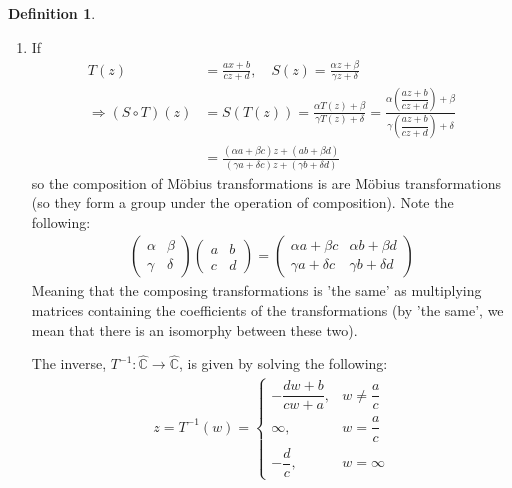 \documentclass[12pt, a4paper]{article}
\theoremstyle{plain}
\theoremstyle{definition}
\newtheorem{definition}{Definition} %
\begin{document}
\begin{definition}
\begin{enumerate}
					\item If
						\begin{align*}
							T(z) &= \frac{ax+b}{cz+d}, \quad S(z) = \frac{\alpha z+\beta}{\gamma z + \delta}\\
							\Rightarrow (S\circ T)(z) &=
							S(T(z)) = 
							\frac{\alpha T(z) + \beta}{\gamma T(z) + \delta} = 
							\frac{\alpha\left(\dfrac{az+b}{cz+d}\right)+\beta}{\gamma\left(\dfrac{az+b}{cz+d}\right) + \delta}\\ &=
							\frac{(\alpha a + \beta c)z + (ab+\beta d)}{(\gamma a + \delta c)z + (\gamma b + \delta d)}
						\end{align*}
						so the composition of Möbius transformations is are Möbius transformations (so they form a group under the operation of composition). Note the following:
						\begin{align*}
							\begin{pmatrix}
								\alpha & \beta\\
								\gamma & \delta
							\end{pmatrix}
							\begin{pmatrix}
								a & b\\
								c & d
							\end{pmatrix} = 
							\begin{pmatrix}
								\alpha a + \beta c & \alpha b + \beta d\\
								\gamma a + \delta c & \gamma b + \delta d
							\end{pmatrix}
						\end{align*}
						Meaning that the composing transformations is 'the same' as multiplying matrices containing the coefficients of the transformations (by 'the same', we mean that there is an isomorphy between these two).

						The inverse, $T^{-1}:\hat{\mathbb{C}}\to \hat{\mathbb{C}}$, is given by solving the following:
						\begin{align*}
							z = T^{-1}(w) =
							\begin{cases}
								- \dfrac{dw+b}{cw+a},  &w\not = \dfrac{a}{c}\\[0.5cm]
								\infty,  &w = \dfrac{a}{c}\\
								- \dfrac{d}{c},  &w = \infty
							\end{cases}
						\end{align*}\\
				\end{enumerate}
			\end{definition}
\end{document}
